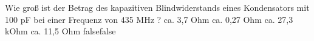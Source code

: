     {Wie groß ist der Betrag des kapazitiven Blindwiderstands eines Kondensators mit 100 pF bei einer Frequenz von 435 MHz ?}
    {ca. 3,7 Ohm}
    {ca. 0,27 Ohm}
    {ca. 27,3 kOhm}
    {ca. 11,5 Ohm}
    {false}{false}
